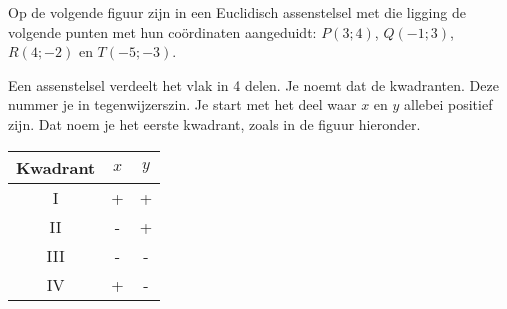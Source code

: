 
Op de volgende figuur zijn in een Euclidisch assenstelsel met die ligging de volgende punten met hun co\"ordinaten aangeduidt: $P(3;4)$, $Q(-1;3)$, $R(4;-2)$ en $T(-5;-3)$.

\begin{center}
		
\end{center}



Een assenstelsel verdeelt het vlak in 4 delen.
Je noemt dat de kwadranten.
Deze nummer je in tegenwijzerszin. 
Je start met het deel waar $x$ en $y$ allebei positief zijn.
Dat noem je het eerste kwadrant, zoals in de figuur hieronder.

\begin{minipage}{.5\linewidth}
\begin{center}
\begin{tabular}{c|c|c}
	Kwadrant & $x$ & $y$ \\
	\hline
	I & + & + \\
	II & - & + \\
	III & - & - \\
	IV & + & - \\
\end{tabular}	
\end{center}
\end{minipage}
\begin{minipage}{.5\linewidth}
\begin{center}
		
\end{center}
\end{minipage}
